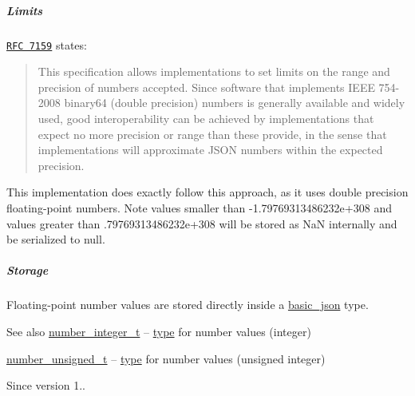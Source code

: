 \subparagraph*{Limits}

\href{http://rfc7159.net/rfc7159}{\tt R\+FC 7159} states\+: \begin{quote}
This specification allows implementations to set limits on the range and precision of numbers accepted. Since software that implements I\+E\+EE 754-\/2008 binary64 (double precision) numbers is generally available and widely used, good interoperability can be achieved by implementations that expect no more precision or range than these provide, in the sense that implementations will approximate J\+S\+ON numbers within the expected precision. \end{quote}


This implementation does exactly follow this approach, as it uses double precision floating-\/point numbers. Note values smaller than {\ttfamily -\/1.\+79769313486232e+308} and values greater than {.\+79769313486232e+308} will be stored as NaN internally and be serialized to {\ttfamily null}.

\subparagraph*{Storage}

Floating-\/point number values are stored directly inside a \hyperlink{classnlohmann_1_1basic__json}{basic\+\_\+json} type.

\begin{DoxySeeAlso}{See also}
\hyperlink{classnlohmann_1_1basic__json_a11e390944da90db83089eb2426a749d3}{number\+\_\+integer\+\_\+t} -- \hyperlink{classnlohmann_1_1basic__json_a5b7c4b35a0ad9f97474912a08965d7ad}{type} for number values (integer)

\hyperlink{classnlohmann_1_1basic__json_ae09af9c23351b7245d9be4d1b2035fef}{number\+\_\+unsigned\+\_\+t} -- \hyperlink{classnlohmann_1_1basic__json_a5b7c4b35a0ad9f97474912a08965d7ad}{type} for number values (unsigned integer)
\end{DoxySeeAlso}
\begin{DoxySince}{Since}
version 1.. 
\end{DoxySince}
